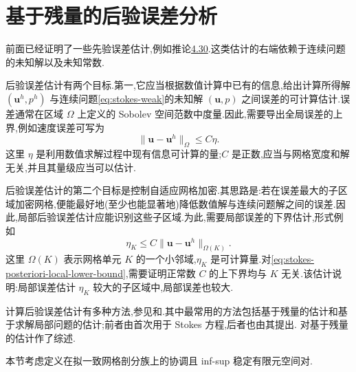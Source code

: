 \section{基于残量的后验误差分析}\label{sec:stokes-residual-a-posteriori}

\begin{note}[后验误差估计的目标]\label{note:stokes-posteriori-goals}
前面已经证明了一些先验误差估计,例如推论\hyperref[cor:stokes-conforming-infsup-estimates]{4.30}.这类估计的右端依赖于连续问题的未知解以及未知常数.

后验误差估计有两个目标.第一,它应当根据数值计算中已有的信息,给出计算所得解 $(\bm{u}^h,p^h)$ 与连续问题\cref{eq:stokes-weak}的未知解 $(\bm{u},p)$ 之间误差的可计算估计.误差通常在区域 $\Omega$ 上定义的 Sobolev 空间范数中度量.因此,需要导出全局误差的上界,例如速度误差可写为
\begin{equation}\label{eq:stokes-posteriori-global-error-form}
  \|\bm{u}-\bm{u}^h\|_{\Omega}\leq C\eta.
\end{equation}
这里 $\eta$ 是利用数值求解过程中现有信息可计算的量;$C$ 是正数,应当与网格宽度和解无关,并且其量级应当可以估计.

后验误差估计的第二个目标是控制自适应网格加密.其思路是:若在误差最大的子区域加密网格,便能最好地(至少也能显著地)降低数值解与连续问题解之间的误差.因此,局部后验误差估计应能识别这些子区域.为此,需要局部误差的下界估计,形式例如
\begin{equation}\label{eq:stokes-posteriori-local-lower-bound}
  \eta_K\leq C\|\bm{u}-\bm{u}^h\|_{\Omega(K)}.
\end{equation}
这里 $\Omega(K)$ 表示网格单元 $K$ 的一个小邻域,$\eta_K$ 是可计算量.对\cref{eq:stokes-posteriori-local-lower-bound},需要证明正常数 $C$ 的上下界均与 $K$ 无关.该估计说明:局部误差估计 $\eta_K$ 较大的子区域中,局部误差也较大.

计算后验误差估计有多种方法,参见\textcite{AinsworthOden2000}和\textcite{Verfuerth2013}.其中最常用的方法包括基于残量的估计和基于求解局部问题的估计;前者由\textcite{Verfuerth1989}首次用于 Stokes 方程,后者也由其提出.\textcite{Verfuerth2013} 对基于残量的估计作了综述.
\end{note}

\begin{note}[基本假设]\label{note:stokes-posteriori-assumptions}
本节考虑定义在拟一致网格剖分族上的协调且 inf-sup 稳定有限元空间对.
\end{note}

